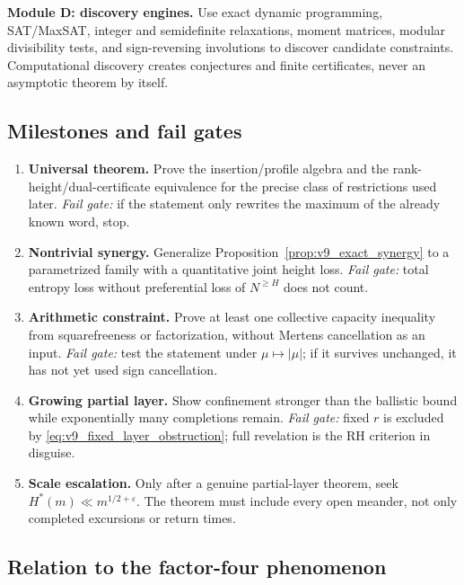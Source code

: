 \documentclass[11pt]{amsart}
\numberwithin{equation}{section}
\theoremstyle{plain}
\theoremstyle{definition}
\theoremstyle{remark}
\newcommand{\eps}{\varepsilon}
\begin{document}
\medskip\noindent\textbf{Module D: discovery engines.}
Use exact dynamic programming, SAT/MaxSAT, integer and semidefinite relaxations,
moment matrices, modular divisibility tests, and sign-reversing involutions to
discover candidate constraints.  Computational discovery creates conjectures
and finite certificates, never an asymptotic theorem by itself.

\subsection{Milestones and fail gates}

\begin{enumerate}[label=\textbf{V9.\arabic*.},leftmargin=*]
\item \textbf{Universal theorem.}  Prove the insertion/profile algebra and the
rank-height/dual-certificate equivalence for the precise class of restrictions
used later.  \emph{Fail gate:} if the statement only rewrites the maximum of
the already known word, stop.
\item \textbf{Nontrivial synergy.}  Generalize
Proposition~\ref{prop:v9_exact_synergy} to a parametrized family with a
quantitative joint height loss.  \emph{Fail gate:} total entropy loss without
preferential loss of $N^{\ge H}$ does not count.
\item \textbf{Arithmetic constraint.}  Prove at least one collective capacity
inequality from squarefreeness or factorization, without Mertens cancellation
as an input.  \emph{Fail gate:} test the statement under $\mu\mapsto|\mu|$;
if it survives unchanged, it has not yet used sign cancellation.
\item \textbf{Growing partial layer.}  Show confinement stronger than the
ballistic bound while exponentially many completions remain.  \emph{Fail
gate:} fixed $r$ is excluded by \eqref{eq:v9_fixed_layer_obstruction}; full
revelation is the RH criterion in disguise.
\item \textbf{Scale escalation.}  Only after a genuine partial-layer theorem,
seek $H^*(m)\ll m^{1/2+\eps}$.  The theorem must include every open meander,
not only completed excursions or return times.
\end{enumerate}

\subsection{Relation to the factor-four phenomenon}
\end{document}
